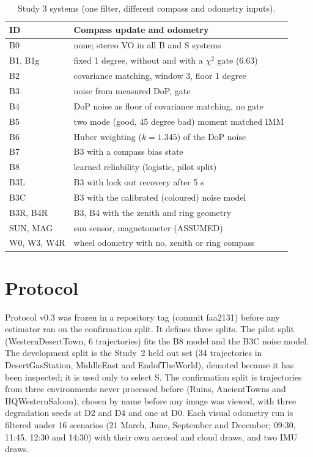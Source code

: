\begin{table}[t]
\caption{Study 3 systems (one filter, different compass and odometry inputs).}
\label{tab:systems}
\centering\footnotesize\setlength{\tabcolsep}{3pt}
\begin{tabular}{ll}
\toprule
ID & Compass update and odometry \\
\midrule
B0 & none; stereo VO in all B and S systems \\
B1, B1g & fixed 1 degree, without and with a $\chi^2$ gate (6.63) \\
B2 & covariance matching, window 3, floor 1 degree \\
B3 & noise from measured DoP, gate \\
B4 & DoP noise as floor of covariance matching, no gate \\
B5 & two mode (good, 45 degree bad) moment matched IMM \\
B6 & Huber weighting ($k = 1.345$) of the DoP noise \\
B7 & B3 with a compass bias state \\
B8 & learned reliability (logistic, pilot split) \\
B3L & B3 with lock out recovery after 5 s \\
B3C & B3 with the calibrated (coloured) noise model \\
B3R, B4R & B3, B4 with the zenith and ring geometry \\
SUN, MAG & sun sensor, magnetometer (ASSUMED) \\
W0, W3, W4R & wheel odometry with no, zenith or ring compass \\
\bottomrule
\end{tabular}
\end{table}

\section{Protocol}
\label{sec:protocol}
Protocol v0.3 was frozen in a repository tag (commit faa2131) before any estimator ran on the confirmation split. It defines three splits. The pilot split (WesternDesertTown, 6 trajectories) fits the B8 model and the B3C noise model. The development split is the Study~2 held out set (34 trajectories in DesertGasStation, MiddleEast and EndofTheWorld), demoted because it has been inspected; it is used only to select S. The confirmation split is \sNconf{} trajectories from three environments never processed before (Ruins, AncientTowns and HQWesternSaloon), chosen by name before any image was viewed, with three degradation seeds at D2 and D4 and one at D0. Each visual odometry run is filtered under 16 scenarios (21 March, June, September and December; 09:30, 11:45, 12:30 and 14:30) with their own aerosol and cloud draws, and two IMU draws.

